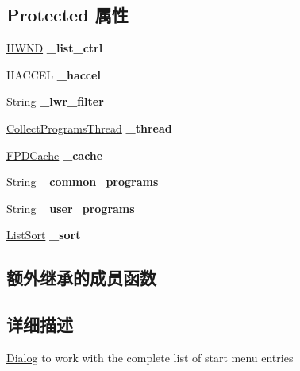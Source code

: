 \subsection*{Protected 属性}
\begin{DoxyCompactItemize}
\item 
\mbox{\label{struct_find_program_dlg_a8426cd1582f1b2b1530cdd7b7eab803f}} 
\hyperlink{interfacevoid}{H\+W\+ND} {\bfseries \+\_\+list\+\_\+ctrl}
\item 
\mbox{\label{struct_find_program_dlg_a7008b319e35f4684ee14d3a394fdc818}} 
H\+A\+C\+C\+EL {\bfseries \+\_\+haccel}
\item 
\mbox{\label{struct_find_program_dlg_a01afbca7685d63ff99635203b42bf515}} 
String {\bfseries \+\_\+lwr\+\_\+filter}
\item 
\mbox{\label{struct_find_program_dlg_a5cd6d857317c5f151d8821ccc2f6e65b}} 
\hyperlink{struct_collect_programs_thread}{Collect\+Programs\+Thread} {\bfseries \+\_\+thread}
\item 
\mbox{\label{struct_find_program_dlg_a00784dd5ef2644242b1682dff15e9686}} 
\hyperlink{classlist}{F\+P\+D\+Cache} {\bfseries \+\_\+cache}
\item 
\mbox{\label{struct_find_program_dlg_abd35aa03efeeefdeaad3173281e0844b}} 
String {\bfseries \+\_\+common\+\_\+programs}
\item 
\mbox{\label{struct_find_program_dlg_a741ccc9f68d44607b250354854ef3076}} 
String {\bfseries \+\_\+user\+\_\+programs}
\item 
\mbox{\label{struct_find_program_dlg_ae0134c2c0dde7574422f7fb5d59a3a89}} 
\hyperlink{struct_list_sort}{List\+Sort} {\bfseries \+\_\+sort}
\end{DoxyCompactItemize}
\subsection*{额外继承的成员函数}


\subsection{详细描述}
\hyperlink{struct_dialog}{Dialog} to work with the complete list of start menu entries 

